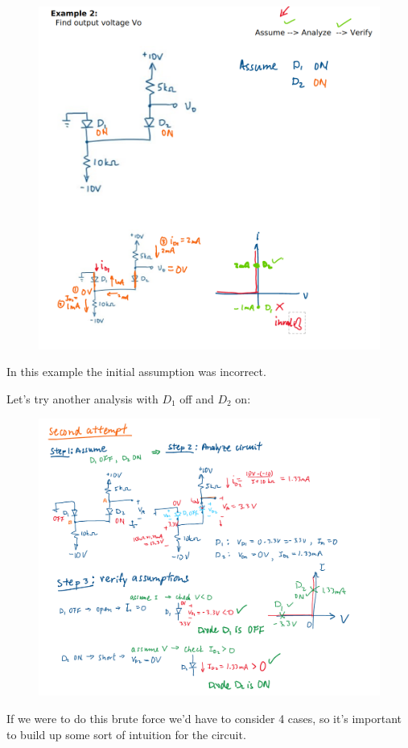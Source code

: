 \documentclass[10pt]{article}
\begin{document}
\begin{figure}[H]
	\centering
	\includegraphics[width=0.8\linewidth]{img/image_2022-09-12-10-02-42.png}
\end{figure}

In this example the initial assumption was incorrect. 

Let's try another analysis with $ D_1  $ off and $ D_2 $ on:

\begin{figure}[H]
	\centering
	\includegraphics[width=0.8\linewidth]{img/image_2022-09-13-13-20-51.png}
\end{figure}

If we were to do this brute force we'd have to consider 4 cases, so it's important to build up some sort of intuition for the circuit.
\end{document}
